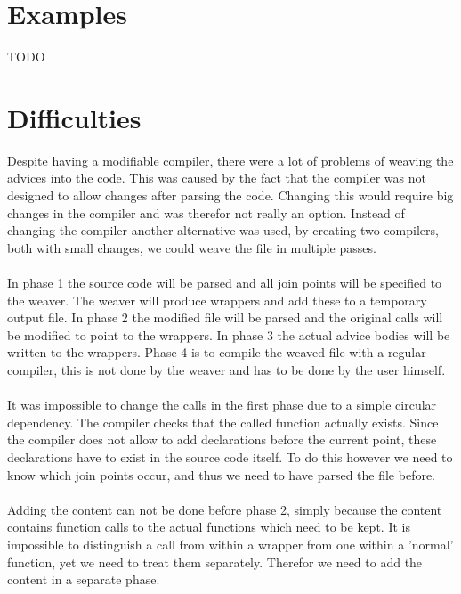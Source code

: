 \documentclass[a4paper]{report}
\begin{document}
\section{Examples}
TODO

\section{Difficulties}
Despite having a modifiable compiler, there were a lot of problems of weaving the advices into the code. This was caused by the fact that the compiler was not designed to allow changes after parsing the code. Changing this would require big changes in the compiler and was therefor not really an option. Instead of changing the compiler another alternative was used, by creating two compilers, both with small changes, we could weave the file in multiple passes.\\
\\
In phase 1 the source code will be parsed and all join points will be specified to the weaver. The weaver will produce wrappers and add these to a temporary output file. In phase 2 the modified file will be parsed and the original calls will be modified to point to the wrappers. In phase 3 the actual advice bodies will be written to the wrappers. Phase 4 is to compile the weaved file with a regular compiler, this is not done by the weaver and has to be done by the user himself.\\
\\
It was impossible to change the calls in the first phase due to a simple circular dependency. The compiler checks that the called function actually exists. Since the compiler does not allow to add declarations before the current point, these declarations have to exist in the source code itself. To do this however we need to know which join points occur, and thus we need to have parsed the file before.\\
\\
Adding the content can not be done before phase 2, simply because the content contains function calls to the actual functions which need to be kept. It is impossible to distinguish a call from within a wrapper from one within a 'normal' function, yet we need to treat them separately. Therefor we need to add the content in a separate phase.
\end{document}
